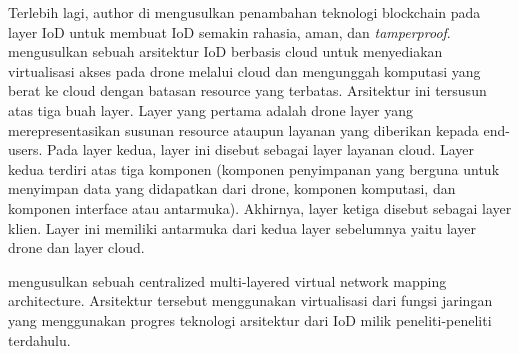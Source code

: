 Terlebih lagi, author di \citep{aggarwal2019new} mengusulkan penambahan teknologi blockchain pada layer IoD untuk membuat IoD semakin rahasia, aman, dan \emph{tamperproof}. \citet{qureshi2016dronemap} mengusulkan sebuah arsitektur IoD berbasis cloud untuk menyediakan virtualisasi akses pada drone melalui cloud dan mengunggah komputasi yang berat ke cloud dengan batasan resource yang terbatas. Arsitektur ini tersusun atas tiga buah layer. Layer yang pertama adalah drone layer yang merepresentasikan susunan resource ataupun layanan yang diberikan kepada end-users. Pada layer kedua, layer ini disebut sebagai layer layanan cloud. Layer kedua terdiri atas tiga komponen (komponen penyimpanan yang berguna untuk menyimpan data yang didapatkan dari drone, komponen komputasi, dan komponen interface atau antarmuka). Akhirnya, layer ketiga disebut sebagai layer klien. Layer ini memiliki antarmuka dari kedua layer sebelumnya yaitu layer drone dan layer cloud. 

\citet{zhang2020multidomain} mengusulkan sebuah centralized multi-layered virtual network mapping architecture. Arsitektur tersebut menggunakan virtualisasi dari fungsi jaringan yang menggunakan progres teknologi arsitektur dari IoD milik peneliti-peneliti terdahulu.
